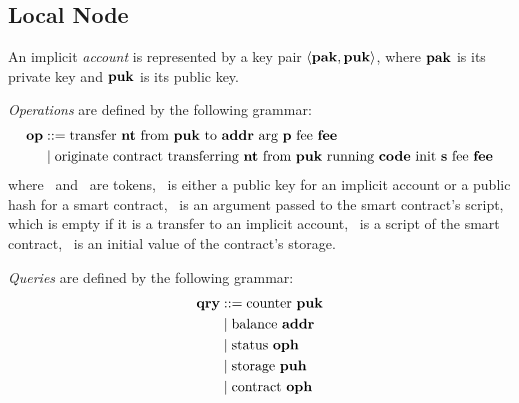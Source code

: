 \documentclass[a4paper]{llncs}
\begin{document}
\subsection{Local Node}
\label{sec:local-node}


\begin{definition}%
  An implicit \emph{account} is represented by a key pair $\langle
  \PAK, \PUK
  \rangle $, where
  $\PAK$ is its private key and $\PUK$ is its public key.
\end{definition}


\begin{definition}%
  \emph{Operations} are defined by the following grammar:
  \begin{align*}
    \OP &::= \TRANSFER[\PARAMETER]\NTEZ\PUK\ADDR\MTEZ
    \\&\mid \ORIGINATE\NTEZ\PUK\CODE\INIT\MTEZ
  \end{align*}
  where \NTEZ\ and \MTEZ\ are tokens, \ADDR\ is either a public
  key for an implicit account  or a public hash for a smart contract,
  \PARAMETER\ is an argument passed to the smart contract's script,
  which is empty if it is a transfer to an implicit account, \CODE\ is
  a script of the smart contract, \INIT\ is an initial value of the
  contract's storage. 
\end{definition}

\begin{definition}%
\emph{Queries} are defined by the following grammar:
\begin{align*}
  \QRY & ::=
  \GETCOUNTER\PUK  
  \\&\mid \GETBALANCE\ADDR
  \\&\mid \GETSTATUS\OPH
  \\&\mid \GETSTORAGE\PUH
  \\&\mid \GETCONTRACT\OPH
\end{align*}
\end{definition}
\end{document}
